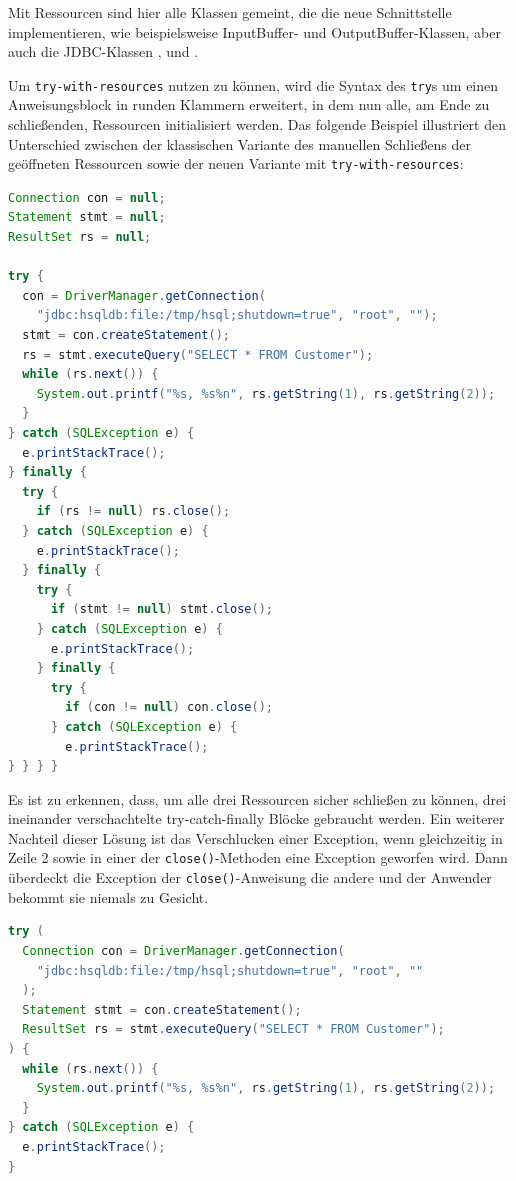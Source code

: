 \documentclass[times, 10pt,twocolumn]{article}
\begin{document}
Mit Ressourcen sind hier alle Klassen gemeint, die die neue Schnittstelle  implementieren, wie beispielsweise
InputBuffer- und OutputBuffer-Klassen, aber auch die JDBC-Klassen ,  und .

Um \texttt{try-with-resources} nutzen zu können, wird die Syntax des \texttt{try}s um einen Anweisungsblock in runden Klammern erweitert,
in dem nun alle, am Ende zu schließenden, Ressourcen initialisiert werden. Das folgende Beispiel illustriert den Unterschied zwischen der
klassischen Variante des manuellen Schließens der geöffneten Ressourcen sowie der neuen Variante mit \texttt{try-with-resources}:

\begin{lstlisting}[language=java,breaklines=true]
Connection con = null;
Statement stmt = null;
ResultSet rs = null;

try {
  con = DriverManager.getConnection(
	"jdbc:hsqldb:file:/tmp/hsql;shutdown=true", "root", "");
  stmt = con.createStatement();
  rs = stmt.executeQuery("SELECT * FROM Customer");
  while (rs.next()) {
	System.out.printf("%s, %s%n", rs.getString(1), rs.getString(2));
  }
} catch (SQLException e) {
  e.printStackTrace();
} finally {
  try {
	if (rs != null) rs.close();
  } catch (SQLException e) {
	e.printStackTrace();
  } finally {
	try {
	  if (stmt != null)	stmt.close();
	} catch (SQLException e) {
	  e.printStackTrace();
	} finally {
	  try {
		if (con != null) con.close();
	  } catch (SQLException e) {
		e.printStackTrace();
} } } }
\end{lstlisting}

Es ist zu erkennen, dass, um alle drei Ressourcen sicher schließen zu können, drei ineinander verschachtelte try-catch-finally Blöcke
gebraucht werden. Ein weiterer Nachteil dieser Lösung ist das Verschlucken einer Exception, wenn gleichzeitig in Zeile 2 sowie in einer
der \texttt{close()}-Methoden eine Exception geworfen wird. Dann überdeckt die Exception der \texttt{close()}-Anweisung die andere und der
Anwender bekommt sie niemals zu Gesicht.\cite{javainsel2}

\begin{lstlisting}[language=java,breaklines=true]
try (
  Connection con = DriverManager.getConnection(
	"jdbc:hsqldb:file:/tmp/hsql;shutdown=true", "root", ""
  );
  Statement stmt = con.createStatement();
  ResultSet rs = stmt.executeQuery("SELECT * FROM Customer");
) {
  while (rs.next()) {
	System.out.printf("%s, %s%n", rs.getString(1), rs.getString(2));
  }
} catch (SQLException e) {
  e.printStackTrace();
}
\end{lstlisting}
\end{document}
